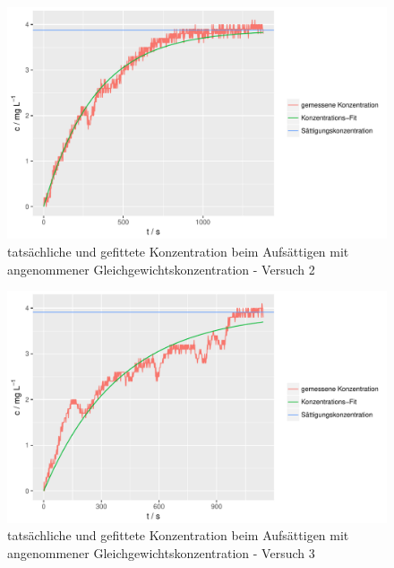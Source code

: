 \documentclass[12pt,liststotoc]{report}
\begin{document}
\begin{figure}[H]
\centering
\includegraphics[width=1\textwidth]{Graphics/aufsaettigen_versuch-2.pdf} 
\caption[Aufsättigen Versuch 2]{tatsächliche und gefittete Konzentration beim Aufsättigen mit angenommener Gleichgewichtskonzentration - Versuch 2}
\label{fig:c_auf_versuch2_saett}
\end{figure}
\noindent

\begin{figure}[H]
\centering
\includegraphics[width=1\textwidth]{Graphics/aufsaettigen_versuch-3.pdf} 
\caption[Aufsättigen Versuch 3]{tatsächliche und gefittete Konzentration beim Aufsättigen mit angenommener Gleichgewichtskonzentration - Versuch 3}
\label{fig:c_auf_versuch3_saett}
\end{figure}
\noindent
\end{document}
